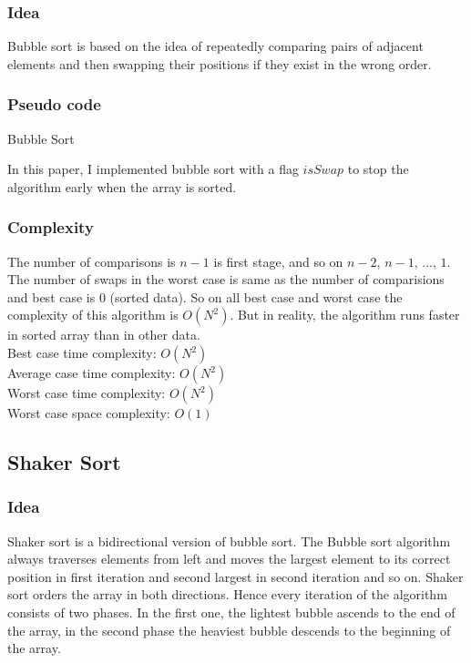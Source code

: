 \documentclass[11pt,a4paper]{article}
\begin{document}
\subsubsection*{Idea}
Bubble sort is based on the idea of repeatedly comparing pairs of adjacent elements and then 
swapping their positions if they exist in the wrong order.

\subsubsection*{Pseudo code}
\begin{algorithm2e}
  \SetAlgoLined
  \caption{Bubble Sort}
\end{algorithm2e}

In this paper, I implemented bubble sort with a flag $isSwap$ to stop the algorithm early
when the array is sorted.

\subsubsection*{Complexity}
The number of comparisons is $n-1$ is first stage, and so on $n-2$, $n-1$, $...$, $1$.
The number of swaps in the worst case is same as the number of comparisions and best case is $0$ (sorted data).
So on all best case and worst case the complexity of this algorithm is $O(N^2)$.
But in reality, the algorithm runs faster in sorted array than in other data.\\
Best case time complexity: $O(N^2)$ \\
Average case time complexity: $O(N^2)$\\
Worst case time complexity: $O(N^2)$ \\
Worst case space complexity: $O(1)$

\subsection{Shaker Sort}
\subsubsection*{Idea}
Shaker sort is a bidirectional version of bubble sort.
The Bubble sort algorithm always traverses elements from left and moves the largest 
element to its correct position in first iteration and second largest in second iteration and so on.
Shaker sort orders the array in both directions. Hence every iteration of the algorithm consists of two phases. 
In the first one, the lightest bubble ascends to the end of the array, in the second phase the heaviest bubble descends to the beginning of the array.
\end{document}
